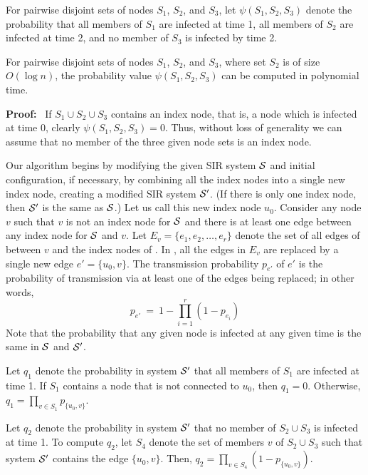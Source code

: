 For pairwise disjoint sets of nodes $S_1$, $S_2$, and $S_3$,
let $\psi(S_1, S_2, S_3)$
denote the probability that all members of $S_1$ are infected at time 1,
all members of $S_2$ are infected at time 2,
and no member of $S_3$ is infected by time 2.

\begin{theorem}\label{thm:generalized_vulnerability_time_2}
For pairwise disjoint sets of nodes $S_1$, $S_2$, and $S_3$,
where  set $S_2$ is of size $O(\log{n})$,
the probability value $\psi(S_1, S_2, S_3)$ can be computed in polynomial time.
\end{theorem}
\noindent
\textbf{Proof:}~  
If $S_1 \cup S_2 \cup S_3$ contains an index node, that is,
a node which is infected at time 0, clearly $\psi(S_1, S_2, S_3) = 0$.
Thus, without loss of generality we can assume that 
no member of the three given node sets is an index node.

Our algorithm begins by modifying the given SIR system $\mbox{${\cal S}$}{}$ and initial configuration, 
if necessary, by combining all the index
nodes into a single new index node, creating a modified SIR system
$\mbox{$\mathcal{S}'$}{}$.  (If there is only one index node, then $\mbox{$\mathcal{S}'$}{}$ is
the same as $\mbox{${\cal S}$}{}$.) Let us call this new index node $u_0$.
Consider any node $v$ such that $v$ is not an index node for $\mbox{${\cal S}$}{}$ and  
there is at least one edge between any index node 
for $\mbox{${\cal S}$}{}$ and $v$.
Let $E_v = \{e_1, e_2, \ldots, e_r\}$ denote the set of all
edges of \cals{} between $v$ and the index nodes of \cals.
In \calsp, all the edges in $E_v$ are replaced by a 
single new edge $e' = \{u_0, v\}$. 
The transmission probability $p_{e'}$ of $e'$ is the
probability of transmission via at least one of the edges being
replaced; in other words,
\[ \displaystyle{
p_{e'} ~=~ 1- \prod_{i=1}^{r} (1-p_{e_i})}
\]
Note that the probability that any given node is infected at any given time
is the same in $\mbox{${\cal S}$}{}$ and $\mbox{$\mathcal{S}'$}{}$.

Let $q_1$ denote the probability in system $\mbox{$\mathcal{S}'$}{}$
that all members of $S_1$ are infected at time 1.
If $S_1$ contains a node that is not connected to $u_0$, then $q_1 = 0$. 
Otherwise,
$q_1 = \displaystyle{
\prod_{v \in S_1} p_{\{u_0,v\}} }$.

Let $q_2$ denote the probability in system $\mbox{$\mathcal{S}'$}{}$
that no member of $S_2 \cup S_3$ is infected at time 1.
To compute $q_2$,
let $S_4$ denote the set of members $v$ of $S_2 \cup S_3$ 
such that system $\mbox{$\mathcal{S}'$}{}$ contains the edge $\{u_0, v\}$.
Then, $q_2 = \displaystyle{
\prod_{v \in S_4} (1 - p_{\{u_0,v\}}) }$.

